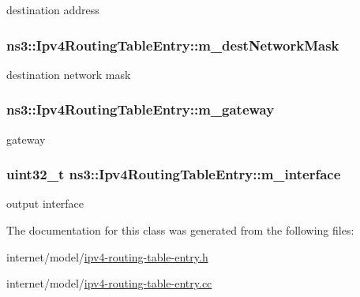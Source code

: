destination address 

\subsubsection[{\texorpdfstring{m\+\_\+dest\+Network\+Mask}{m_destNetworkMask}}]{ ns3\+::\+Ipv4\+Routing\+Table\+Entry\+::m\+\_\+dest\+Network\+Mask\hspace{0.3cm}{\ttfamily [private]}}\hypertarget{classns3_1_1Ipv4RoutingTableEntry_a7cfc84bfd8af1e8dcaad6b2a30ce1244}{}\label{classns3_1_1Ipv4RoutingTableEntry_a7cfc84bfd8af1e8dcaad6b2a30ce1244}


destination network mask 

\subsubsection[{\texorpdfstring{m\+\_\+gateway}{m_gateway}}]{ ns3\+::\+Ipv4\+Routing\+Table\+Entry\+::m\+\_\+gateway\hspace{0.3cm}{\ttfamily [private]}}\hypertarget{classns3_1_1Ipv4RoutingTableEntry_ab3263e0528494892175f5faa40ee0da8}{}\label{classns3_1_1Ipv4RoutingTableEntry_ab3263e0528494892175f5faa40ee0da8}


gateway 

\subsubsection[{\texorpdfstring{m\+\_\+interface}{m_interface}}]{\setlength{\rightskip}{0pt plus 5cm}uint32\+\_\+t ns3\+::\+Ipv4\+Routing\+Table\+Entry\+::m\+\_\+interface\hspace{0.3cm}{\ttfamily [private]}}\hypertarget{classns3_1_1Ipv4RoutingTableEntry_a4e7f2149b9b7af1599b75ff5072ce2c2}{}\label{classns3_1_1Ipv4RoutingTableEntry_a4e7f2149b9b7af1599b75ff5072ce2c2}


output interface 



The documentation for this class was generated from the following files\+:\begin{DoxyCompactItemize}
\item 
internet/model/\hyperlink{ipv4-routing-table-entry_8h}{ipv4-\/routing-\/table-\/entry.\+h}\item 
internet/model/\hyperlink{ipv4-routing-table-entry_8cc}{ipv4-\/routing-\/table-\/entry.\+cc}\end{DoxyCompactItemize}
